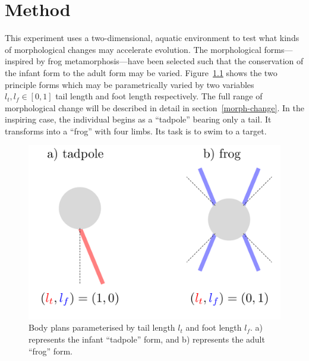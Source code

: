 \chapter{Method}

This experiment uses a two-dimensional, aquatic environment to test
what kinds of morphological changes may accelerate evolution. The
morphological forms---inspired by frog metamorphosis---have been
selected such that the conservation of the infant form to the adult
form may be varied. Figure~\ref{morphology} shows the two principle
forms which may be parametrically varied by two variables $l_t, l_f
\in [0, 1]$ tail length and foot length respectively.  The full range
of morphological change will be described in detail in
section~\ref{morph-change}.  In the inspiring case, the individual
begins as a ``tadpole'' bearing only a tail. It transforms into a
``frog'' with four limbs. Its task is to swim to a target.

\begin{figure}[h]
  \centering
  \includegraphics[scale=0.4]{fig/forms.pdf} 
  \vspace{-30pt}
  \caption[Body plans]{\label{morphology}Body plans parameterised by
    tail length $l_t$ and foot length $l_f$. a) represents the infant
    ``tadpole'' form, and b) represents the adult ``frog'' form. }
\end{figure}

